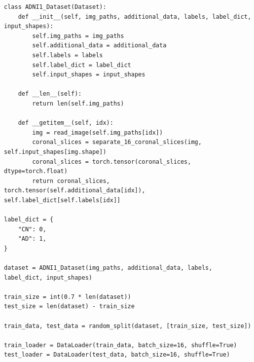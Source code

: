 \documentclass[a4paper, 12pt]{article}
\begin{document}
\begin{lstlisting}
class ADNI1_Dataset(Dataset):
    def __init__(self, img_paths, additional_data, labels, label_dict, input_shapes):
        self.img_paths = img_paths
        self.additional_data = additional_data
        self.labels = labels
        self.label_dict = label_dict
        self.input_shapes = input_shapes

    def __len__(self):
        return len(self.img_paths)

    def __getitem__(self, idx):
        img = read_image(self.img_paths[idx])
        coronal_slices = separate_16_coronal_slices(img, self.input_shapes[img.shape])
        coronal_slices = torch.tensor(coronal_slices, dtype=torch.float)
        return coronal_slices, torch.tensor(self.additional_data[idx]), self.label_dict[self.labels[idx]]

label_dict = {
    "CN": 0,
    "AD": 1,
}

dataset = ADNI1_Dataset(img_paths, additional_data, labels, label_dict, input_shapes)

train_size = int(0.7 * len(dataset))
test_size = len(dataset) - train_size

train_data, test_data = random_split(dataset, [train_size, test_size])

train_loader = DataLoader(train_data, batch_size=16, shuffle=True)
test_loader = DataLoader(test_data, batch_size=16, shuffle=True)
\end{lstlisting}

\newpage
\end{document}
